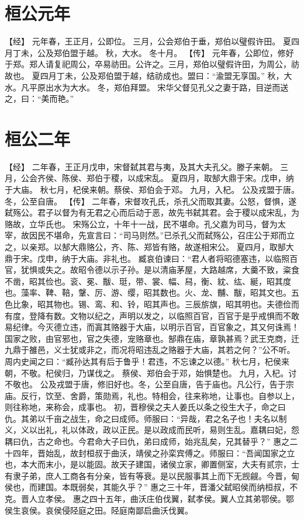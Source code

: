 \documentclass[a4paper,12pt,UTF8,twoside]{ctexbook}
\begin{document}
\chapter{桓公元年}

【经】
元年春，王正月，公即位。
三月，公会郑伯于垂，郑伯以璧假许田。
夏四月丁未，公及郑伯盟于越。
秋，大水。
冬十月。
【传】
元年春，公即位，修好于郑。郑人请复祀周公，卒易祊田。公许之。三月，郑伯以璧假许田，为周公，祊故也。
夏四月丁未，公及郑伯盟于越，结祊成也。盟曰：“渝盟无享国。”
秋，大水。凡平原出水为大水。
冬，郑伯拜盟。
宋华父督见孔父之妻于路，目逆而送之，曰：“美而艳。”

\chapter{桓公二年}

【经】
二年春，王正月戊申，宋督弑其君与夷，及其大夫孔父。滕子来朝。
三月，公会齐侯、陈侯、郑伯于稷，以成宋乱。
夏四月，取郜大鼎于宋。戊申，纳于大庙。
秋七月，杞侯来朝。蔡侯、郑伯会于邓。
九月，入杞。
公及戎盟于唐。冬，公至自唐。
【传】
二年春，宋督攻孔氏，杀孔父而取其妻。公怒，督惧，遂弑殇公。君子以督为有无君之心而后动于恶，故先书弑其君。会于稷以成宋乱，为赂故，立华氏也。
宋殇公立，十年十一战，民不堪命。孔父嘉为司马，督为太宰，故因民不堪命，先宣言曰：“司马则然。”已杀孔父而弑殇公，召庄公于郑而立之，以亲郑。以郜大鼎赂公，齐、陈、郑皆有赂，故遂相宋公。
夏四月，取郜大鼎于宋。戊申，纳于大庙。非礼也。
臧哀伯谏曰：“君人者将昭德塞违，以临照百官，犹惧或失之。故昭令德以示子孙。是以清庙茅屋，大路越席，大羹不致，粢食不凿，昭其俭也。衮、冕、黻、珽，带、裳、幅、舄，衡、紞、纮、綖，昭其度也。藻率、鞞、鞛，鞶、厉、游、缨，昭其数也。火、龙、黼、黻，昭其文也。五色比象，昭其物也。锡、鸾、和、铃，昭其声也。三辰旂旗，昭其明也。夫德俭而有度，登降有数。文物以纪之，声明以发之，以临照百官，百官于是乎戒惧而不敢易纪律。今灭德立违，而寘其赂器于大庙，以明示百官，百官象之，其又何诛焉！国家之败，由官邪也，官之失德，宠赂章也。郜鼎在庙，章孰甚焉？武王克商，迁九鼎于雒邑，义士犹或非之，而况将昭违乱之赂器于大庙，其若之何？”公不听。周内史闻之曰：“臧孙达其有后于鲁乎！君违，不忘谏之以德。”
秋七月，杞侯来朝，不敬。杞侯归，乃谋伐之。
蔡侯、郑伯会于邓，始惧楚也。
九月，入杞。讨不敬也。
公及戎盟于唐，修旧好也。冬，公至自唐，告于庙也。凡公行，告于宗庙。反行，饮至、舍爵，策勋焉，礼也。特相会，往来称地，让事也。自参以上，则往称地，来称会，成事也。
初，晋穆侯之夫人姜氏以条之役生大子，命之曰仇。其弟以千亩之战生，命之曰成师。师服曰：“异哉，君之名子也！夫名以制义，义以出礼，礼以体政，政以正民。是以政成而民听，易则生乱。嘉耦曰妃，怨耦曰仇，古之命也。今君命大子曰仇，弟曰成师，始兆乱矣，兄其替乎？”
惠之二十四年，晋始乱，故封桓叔于曲沃，靖侯之孙栾宾傅之。师服曰：“吾闻国家之立也，本大而末小，是以能固。故天子建国，诸侯立家，卿置侧室，大夫有贰宗，士有隶子弟，庶人工商各有分亲，皆有等衰。是以民服事其上而下无觊觎。今晋，甸侯也，而建国。本既弱矣，其能久乎？”
惠之三十年，晋潘父弑昭侯而纳桓叔，不克。晋人立孝侯。
惠之四十五年，曲沃庄伯伐翼，弑孝侯。翼人立其弟鄂侯。鄂侯生哀侯。哀侯侵陉庭之田。陉庭南鄙启曲沃伐翼。
\end{document}
